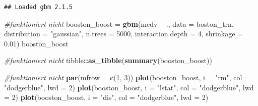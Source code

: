 \documentclass[]{report}
\newenvironment{Shaded}{\begin{snugshade}}{\end{snugshade}}
\newcommand{\KeywordTok}[1]{\textcolor[rgb]{0.13,0.29,0.53}{\textbf{#1}}}
\newcommand{\DataTypeTok}[1]{\textcolor[rgb]{0.13,0.29,0.53}{#1}}
\newcommand{\DecValTok}[1]{\textcolor[rgb]{0.00,0.00,0.81}{#1}}
\newcommand{\FloatTok}[1]{\textcolor[rgb]{0.00,0.00,0.81}{#1}}
\newcommand{\StringTok}[1]{\textcolor[rgb]{0.31,0.60,0.02}{#1}}
\newcommand{\CommentTok}[1]{\textcolor[rgb]{0.56,0.35,0.01}{\textit{#1}}}
\newcommand{\OperatorTok}[1]{\textcolor[rgb]{0.81,0.36,0.00}{\textbf{#1}}}
\newcommand{\NormalTok}[1]{#1}
\begin{document}
\begin{verbatim}
## Loaded gbm 2.1.5
\end{verbatim}

\begin{Shaded}
\begin{Highlighting}[]
\CommentTok{#funktioniert nicht}
\NormalTok{booston_boost =}\StringTok{ }\KeywordTok{gbm}\NormalTok{(medv }\OperatorTok{~}\StringTok{ }\NormalTok{., }\DataTypeTok{data =}\NormalTok{ boston_trn, }\DataTypeTok{distribution =} \StringTok{"gaussian"}\NormalTok{, }
                    \DataTypeTok{n.trees =} \DecValTok{5000}\NormalTok{, }\DataTypeTok{interaction.depth =} \DecValTok{4}\NormalTok{, }\DataTypeTok{shrinkage =} \FloatTok{0.01}\NormalTok{)}
\NormalTok{booston_boost}
\end{Highlighting}
\end{Shaded}

\begin{Shaded}
\begin{Highlighting}[]
\CommentTok{#funktioniert nicht}
\NormalTok{tibble}\OperatorTok{::}\KeywordTok{as_tibble}\NormalTok{(}\KeywordTok{summary}\NormalTok{(booston_boost))}
\end{Highlighting}
\end{Shaded}

\begin{Shaded}
\begin{Highlighting}[]
\CommentTok{#funktioniert nicht}
\KeywordTok{par}\NormalTok{(}\DataTypeTok{mfrow =} \KeywordTok{c}\NormalTok{(}\DecValTok{1}\NormalTok{, }\DecValTok{3}\NormalTok{))}
\KeywordTok{plot}\NormalTok{(booston_boost, }\DataTypeTok{i =} \StringTok{"rm"}\NormalTok{, }\DataTypeTok{col =} \StringTok{"dodgerblue"}\NormalTok{, }\DataTypeTok{lwd =} \DecValTok{2}\NormalTok{)}
\KeywordTok{plot}\NormalTok{(booston_boost, }\DataTypeTok{i =} \StringTok{"lstat"}\NormalTok{, }\DataTypeTok{col =} \StringTok{"dodgerblue"}\NormalTok{, }\DataTypeTok{lwd =} \DecValTok{2}\NormalTok{)}
\KeywordTok{plot}\NormalTok{(booston_boost, }\DataTypeTok{i =} \StringTok{"dis"}\NormalTok{, }\DataTypeTok{col =} \StringTok{"dodgerblue"}\NormalTok{, }\DataTypeTok{lwd =} \DecValTok{2}\NormalTok{)}
\end{Highlighting}
\end{Shaded}

\begin{Shaded}
\end{Shaded}
\end{document}
